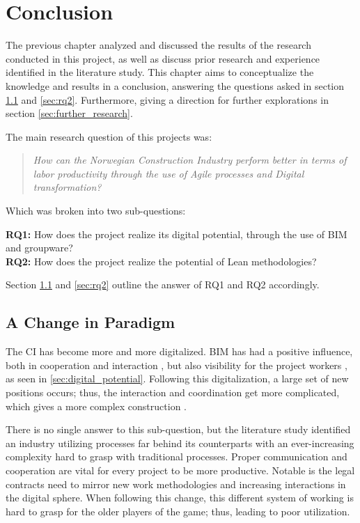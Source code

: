 
\chapter{Conclusion} \label{cha:conclusion}
The previous chapter analyzed and discussed the results of the research conducted in this project, as well as discuss prior research and experience identified in the literature study. This chapter aims to conceptualize the knowledge and results in a conclusion, answering the questions asked in section \ref{sec:rq1} and \ref{sec:rq2}. Furthermore, giving a direction for further explorations in section \ref{sec:further_research}.

\noindent The main research question of this projects was: 
\begin{quote}
    \textit{How can the Norwegian Construction Industry perform better in terms of labor productivity through the use of Agile processes and Digital transformation?} 
\end{quote}

\noindent Which was broken into two sub-questions:

{\noindent \bf RQ1:} How does the project realize its digital potential, through the use of BIM and groupware? \\
{\bf RQ2:} How does the project realize the potential of Lean methodologies?

Section \ref{sec:rq1} and \ref{sec:rq2} outline the answer of RQ1 and RQ2 accordingly.

\section{A Change in Paradigm} \label{sec:rq1}
The CI has become more and more digitalized. BIM has had a positive influence, both in cooperation and interaction \cite{frank_gehry, gu2010understanding}, but also visibility for the project workers \cite{arayici2010building}, as seen in \ref{sec:digital_potential}. Following this digitalization, a large set of new positions occurs; thus, the interaction and coordination get more complicated, which gives a more complex construction \cite{arayici2010building, eadie2013bim, arayici2011technology}.

There is no single answer to this sub-question, but the literature study identified an industry utilizing processes far behind its counterparts with an ever-increasing complexity hard to grasp with traditional processes. Proper communication and cooperation are vital for every project to be more productive. Notable is the legal contracts need to mirror new work methodologies and increasing interactions in the digital sphere. When following this change, this different system of working is hard to grasp for the older players of the game; thus, leading to poor utilization. 

